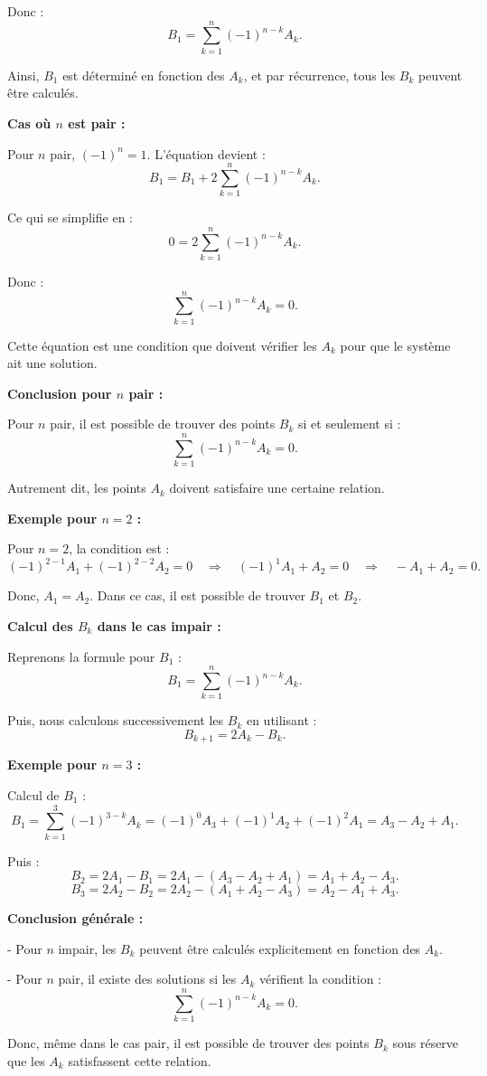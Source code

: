 \documentclass[a4paper,12pt]{article}
\begin{document}
\begin{solutionbox}
Donc :
\[
B_1 = \sum_{k=1}^{n} (-1)^{n-k} A_k.
\]

Ainsi, \( B_1 \) est déterminé en fonction des \( A_k \), et par récurrence, tous les \( B_k \) peuvent être calculés.

\textbf{Cas où \( n \) est pair :}

Pour \( n \) pair, \( (-1)^n = 1 \). L'équation devient :
\[
B_1 = B_1 + 2 \sum_{k=1}^{n} (-1)^{n-k} A_k.
\]

Ce qui se simplifie en :
\[
0 = 2 \sum_{k=1}^{n} (-1)^{n-k} A_k.
\]

Donc :
\[
\sum_{k=1}^{n} (-1)^{n-k} A_k = 0.
\]

Cette équation est une condition que doivent vérifier les \( A_k \) pour que le système ait une solution.

\textbf{Conclusion pour \( n \) pair :}

Pour \( n \) pair, il est possible de trouver des points \( B_k \) si et seulement si :
\[
\sum_{k=1}^{n} (-1)^{n-k} A_k = 0.
\]

Autrement dit, les points \( A_k \) doivent satisfaire une certaine relation.

\textbf{Exemple pour \( n = 2 \) :}

Pour \( n = 2 \), la condition est :
\[
(-1)^{2-1} A_1 + (-1)^{2-2} A_2 = 0 \quad \Rightarrow \quad (-1)^{1} A_1 + A_2 = 0 \quad \Rightarrow \quad -A_1 + A_2 = 0.
\]

Donc, \( A_1 = A_2 \). Dans ce cas, il est possible de trouver \( B_1 \) et \( B_2 \).

\textbf{Calcul des \( B_k \) dans le cas impair :}

Reprenons la formule pour \( B_1 \) :
\[
B_1 = \sum_{k=1}^{n} (-1)^{n-k} A_k.
\]

Puis, nous calculons successivement les \( B_k \) en utilisant :
\[
B_{k+1} = 2A_k - B_k.
\]

\textbf{Exemple pour \( n = 3 \) :}

Calcul de \( B_1 \) :
\[
B_1 = \sum_{k=1}^{3} (-1)^{3-k} A_k = (-1)^{0} A_3 + (-1)^{1} A_2 + (-1)^{2} A_1 = A_3 - A_2 + A_1.
\]

Puis :
\[
B_2 = 2A_1 - B_1 = 2A_1 - (A_3 - A_2 + A_1) = A_1 + A_2 - A_3.
\]
\[
B_3 = 2A_2 - B_2 = 2A_2 - (A_1 + A_2 - A_3) = A_2 - A_1 + A_3.
\]

\textbf{Conclusion générale :}

- Pour \( n \) impair, les \( B_k \) peuvent être calculés explicitement en fonction des \( A_k \).

- Pour \( n \) pair, il existe des solutions si les \( A_k \) vérifient la condition :
\[
\sum_{k=1}^{n} (-1)^{n-k} A_k = 0.
\]

Donc, même dans le cas pair, il est possible de trouver des points \( B_k \) sous réserve que les \( A_k \) satisfassent cette relation.

\end{solutionbox}
\end{document}
